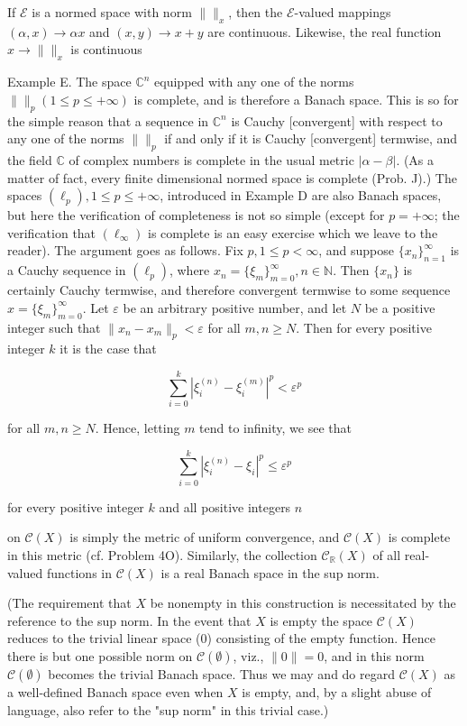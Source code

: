 If $\mathcal{E}$ is a normed space with norm $\|\|_x$, then the $\mathcal{E}$-valued mappings $(\alpha, x) \to \alpha x$ and $(x, y) \to x + y$ are continuous. Likewise, the real function $x \to \|\|_x$ is continuous

Example E. The space $\mathbb{C}^n$ equipped with any one of the norms $\| \|_p (1 \leq p \leq +\infty)$ is complete, and is therefore a Banach space. This is so for the simple reason that a sequence in $\mathbb{C}^n$ is Cauchy [convergent] with respect to any one of the norms $\| \|_p$ if and only if it is Cauchy [convergent] termwise, and the field $\mathbb{C}$ of complex numbers is complete in the usual metric $|\alpha - \beta|$. (As a matter of fact, every finite dimensional normed space is complete (Prob. J).) The spaces $(\ell_p), 1 \leq p \leq +\infty$, introduced in Example D are also Banach spaces, but here the verification of completeness is not so simple (except for $p = +\infty$; the verification that $(\ell_\infty)$ is complete is an easy exercise which we leave to the reader). The argument goes as follows. Fix $p, 1 \leq p < \infty$, and suppose $\{x_n\}_{n=1}^{\infty}$ is a Cauchy sequence in $(\ell_p)$, where $x_n = \{\xi_m\}_{m=0}^{\infty}, n \in \mathbb{N}$. Then $\{x_n\}$ is certainly Cauchy termwise, and therefore convergent termwise to some sequence $x = \{\xi_m\}_{m=0}^{\infty}$. Let $\varepsilon$ be an arbitrary positive number, and let $N$ be a positive integer such that $\| x_n - x_m \|_p < \varepsilon$ for all $m, n \geq N$. Then for every positive integer $k$ it is the case that

$$\sum_{i=0}^{k} |\xi_i^{(n)} - \xi_i^{(m)}|^p < \varepsilon^p$$

for all $m, n \geq N$. Hence, letting $m$ tend to infinity, we see that

$$\sum_{i=0}^{k} |\xi_i^{(n)} - \xi_i|^p \leq \varepsilon^p$$

for every positive integer $k$ and all positive integers $n$

on $\mathcal{C}(X)$ is simply the metric of uniform convergence, and $\mathcal{C}(X)$ is complete in this metric (cf. Problem 4O). Similarly, the collection $\mathcal{C}_{\mathbb{R}}(X)$ of all real-valued functions in $\mathcal{C}(X)$ is a real Banach space in the sup norm.

(The requirement that $X$ be nonempty in this construction is necessitated by the reference to the sup norm. In the event that $X$ is empty the space $\mathcal{C}(X)$ reduces to the trivial linear space (0) consisting of the empty function. Hence there is but one possible norm on $\mathcal{C}(\emptyset)$, viz., $\|0\| = 0$, and in this norm $\mathcal{C}(\emptyset)$ becomes the trivial Banach space. Thus we may and do regard $\mathcal{C}(X)$ as a well-defined Banach space even when $X$ is empty, and, by a slight abuse of language, also refer to the "sup norm" in this trivial case.)


